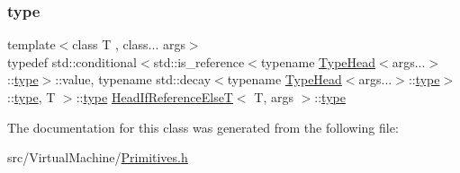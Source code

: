 \subsubsection{\texorpdfstring{type}{type}}
{\footnotesize\ttfamily template$<$class T , class... args$>$ \\
typedef std\+::conditional$<$std\+::is\+\_\+reference$<$typename \hyperlink{struct_type_head}{Type\+Head}$<$args...$>$\+::\hyperlink{struct_head_if_reference_else_t_aa668af542560a9a8541b1ff59f23d51a}{type}$>$\+::value, typename std\+::decay$<$typename \hyperlink{struct_type_head}{Type\+Head}$<$args...$>$\+::\hyperlink{struct_head_if_reference_else_t_aa668af542560a9a8541b1ff59f23d51a}{type}$>$\+::\hyperlink{struct_head_if_reference_else_t_aa668af542560a9a8541b1ff59f23d51a}{type}, T $>$\+::\hyperlink{struct_head_if_reference_else_t_aa668af542560a9a8541b1ff59f23d51a}{type} \hyperlink{struct_head_if_reference_else_t}{Head\+If\+Reference\+ElseT}$<$ T, args $>$\+::\hyperlink{struct_head_if_reference_else_t_aa668af542560a9a8541b1ff59f23d51a}{type}}



The documentation for this class was generated from the following file\+:\begin{DoxyCompactItemize}
\item 
src/\+Virtual\+Machine/\hyperlink{_primitives_8h}{Primitives.\+h}\end{DoxyCompactItemize}
